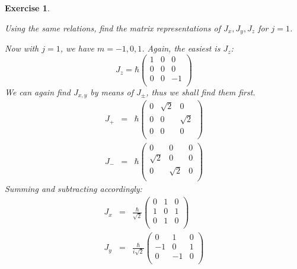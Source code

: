 \documentclass[12pt]{article}
\def\be{\begin{equation}}
\def\ee{\end{equation}}
\def\bea{\begin{eqnarray*}}
\def\eea{\end{eqnarray*}}
\def\f{\frac}
\newtheorem{exercise}{Exercise}
\begin{document}
\begin{exercise}
\begin{exercises}
			\item Using the same relations, find the matrix representations of $J_x, J_y, J_z$ for $j=1$. 
			\begin{multianswer}
				Now with $j=1$, we have $m=-1, 0, 1$. Again, the easiest is $J_z$:
				\be
					J_z = \hbar \begin{pmatrix}
						1 & 0 & 0 \\
						0 & 0 & 0 \\
						0 & 0 & -1 \\
					\end{pmatrix}
				\ee
				We can again find $J_{x, y}$ by means of $J_\pm$, thus we shall find them first. 
				\bea
					J_+ &=& \hbar 
						\begin{pmatrix}
							0 & \sqrt{2} & 0 \\
							0 & 0 & \sqrt{2} \\
							0 & 0 & 0 \\
						\end{pmatrix} \\
					J_- &=& \hbar 
					\begin{pmatrix}
						0 & 0 & 0 \\
						\sqrt{2} & 0 & 0 \\
						0 & \sqrt{2} & 0 \\
					\end{pmatrix}
				\eea
				Summing and subtracting accordingly:
				\bea
					J_x &=& \f{\hbar}{\sqrt{2}} \begin{pmatrix}
						0 & 1 & 0 \\
						1 & 0 & 1 \\
						0 & 1 & 0 \\
					\end{pmatrix} \\
					J_y &=& \f{\hbar}{i\sqrt{2}} \begin{pmatrix}
						0 & 1 & 0 \\
						-1 & 0 & 1 \\
						0 & -1 & 0 \\
					\end{pmatrix}
				\eea				
			\end{multianswer}
			

\end{exercises}
\end{exercise}
\end{document}
